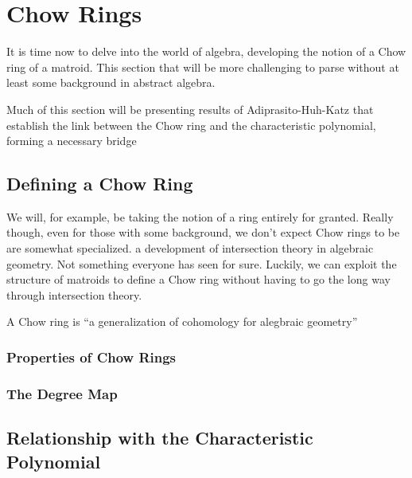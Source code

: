 \documentclass[12pt,oneside]{../../sfsuthesis}
\begin{document}
\chapter{Chow Rings}

It is time now to delve into the world of algebra, developing the notion of a Chow ring of a matroid.
This section that will be more challenging to parse without at least some background in abstract algebra.

Much of this section will be presenting results of Adiprasito-Huh-Katz that establish the link between the Chow ring and the characteristic polynomial, forming a necessary bridge


\section{Defining a Chow Ring}

We will, for example, be taking the notion of a ring entirely for granted.
Really though, even for those with some background, we don't expect Chow rings to be are somewhat specialized.
a development of intersection theory in algebraic geometry.
Not something everyone has seen for sure.
Luckily, we can exploit the structure of matroids to define a Chow ring without having to go the long way through intersection theory.

A Chow ring is ``a generalization of cohomology for alegbraic geometry''

\subsection{Properties of Chow Rings}

\subsection{The Degree Map}


\section{Relationship with the Characteristic Polynomial}

\end{document}
